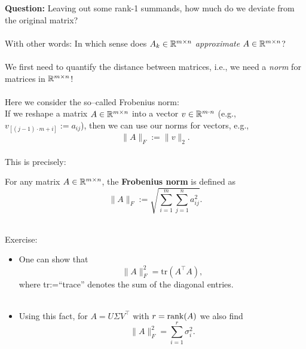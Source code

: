 \begin{frame}
\textbf{\color{header}Question:} Leaving out some rank-1 summands, how much do we deviate from the original matrix?
\\~\\ 
With other words: In which sense does $A_k \in {\mathbb{R}}^{m\times n}$ \textit{approximate} $A \in {\mathbb{R}}^{m\times n}$?
\\~\\
We first need to quantify the distance between matrices, i.e., we need a \textit{norm} for matrices in ${\mathbb{R}}^{m\times n}$!\\~\\
Here we consider the so--called Frobenius norm:\\ If we reshape a matrix $A \in {\mathbb{R}}^{m\times n}$ into a vector $v\in {\mathbb{R}}^{m\cdot n}$  (e.g., $v_{[(j-1)\cdot m+i]}:=a_{ij}$), then we can use our norms for vectors, e.g.,
$$\|A\|_F:=\|v\|_2.$$
~\\
This is precisely: \vspace{-0.1cm}
\begin{definition}
	For any matrix $A\in{\mathbb{R}}^{m\times n}$, the \textbf{Frobenius norm} is defined as
	$$
	\|A\|_F:=\sqrt{\sum\limits_{i=1}^m\sum\limits_{j=1}^na_{ij}^2}.
	$$
\end{definition}
~\\
Exercise:
\begin{itemize}
\item One can show that $$\|A\|_F^2=\text{tr}(A^\top A),$$ where tr:=``trace'' denotes the sum of the diagonal entries.\\~\\
\item Using this fact, for $A=U\Sigma V^\top$ with $r=\operatorname{rank}(A)$ we also find
$$\|A\|_F^2=\sum_{i=1}^{r}\sigma_i^2.$$ 
\end{itemize}
\end{frame}

